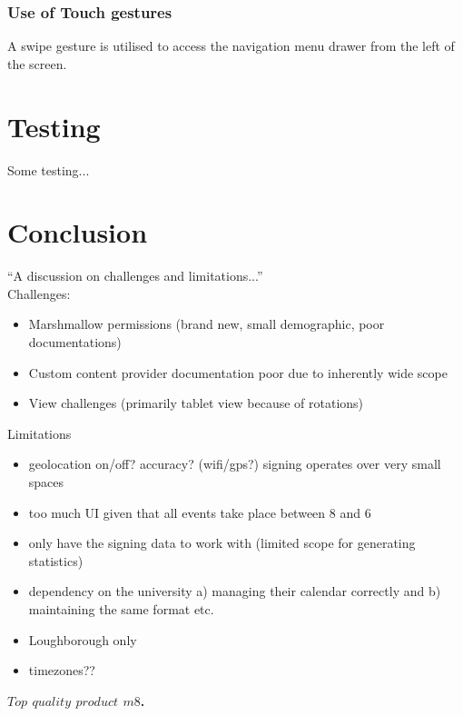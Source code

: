 \documentclass{article}
\begin{document}
\subsubsection{Use of Touch gestures}
A swipe gesture is utilised to access the navigation menu drawer from the left of the screen.

\section{Testing}
Some testing...

\section{Conclusion}
``A discussion on challenges and limitations...''\\
\newline
Challenges:
\begin{itemize}
    \item Marshmallow permissions (brand new, small demographic, poor documentations)
    \item Custom content provider documentation poor due to inherently wide scope 
    \item View challenges (primarily tablet view because of rotations)
\end{itemize}
Limitations
\begin{itemize}
    \item geolocation on/off? accuracy? (wifi/gps?) signing operates over very small spaces
    \item too much UI given that all events take place between 8 and 6
    \item only have the signing data to work with (limited scope for generating statistics)
    \item dependency on the university a) managing their calendar correctly and b) maintaining the same format etc.
    \item Loughborough only 
    \item timezones??
\end{itemize}
\noindent\textbf{$Top$ $quality$ $product$ $m8$.}
\end{document}
